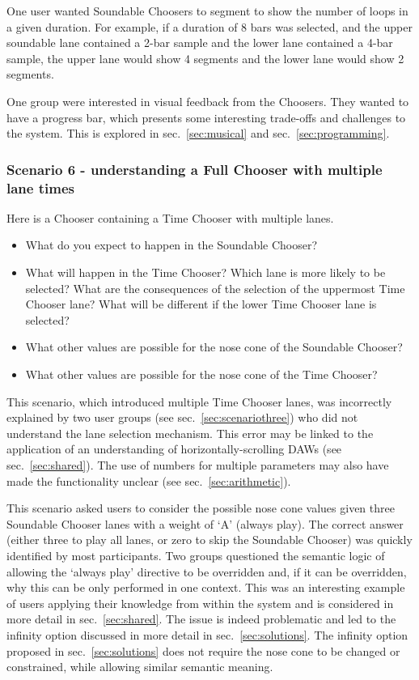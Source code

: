 \documentclass{ppig}
\begin{document}
One user wanted Soundable Choosers to segment to show the number of
loops in a given duration. For example, if a duration of 8 bars was
selected, and the upper soundable lane contained a 2-bar sample and the
lower lane contained a 4-bar sample, the upper lane would show 4
segments and the lower lane would show 2 segments.

One group were interested in visual feedback from the Choosers. They
wanted to have a progress bar, which presents some interesting
trade-offs and challenges to the system. This is explored in
sec.~\ref{sec:musical} and sec.~\ref{sec:programming}.

\hypertarget{sec:scenariosix}{%
\subsubsection{Scenario 6 - understanding a Full Chooser with multiple
lane times}\label{sec:scenariosix}}

Here is a Chooser containing a Time Chooser with multiple lanes.

\begin{itemize}
\item
  What do you expect to happen in the Soundable Chooser?
\item
  What will happen in the Time Chooser? Which lane is more likely to be
  selected? What are the consequences of the selection of the uppermost
  Time Chooser lane? What will be different if the lower Time Chooser
  lane is selected?
\item
  What other values are possible for the nose cone of the Soundable
  Chooser?
\item
  What other values are possible for the nose cone of the Time Chooser?
\end{itemize}

This scenario, which introduced multiple Time Chooser lanes, was
incorrectly explained by two user groups (see
sec.~\ref{sec:scenariothree}) who did not understand the lane selection
mechanism. This error may be linked to the application of an
understanding of horizontally-scrolling DAWs (see
sec.~\ref{sec:shared}). The use of numbers for multiple parameters may
also have made the functionality unclear (see
sec.~\ref{sec:arithmetic}).

This scenario asked users to consider the possible nose cone values
given three Soundable Chooser lanes with a weight of `A' (always play).
The correct answer (either three to play all lanes, or zero to skip the
Soundable Chooser) was quickly identified by most participants. Two
groups questioned the semantic logic of allowing the `always play'
directive to be overridden and, if it can be overridden, why this can be
only performed in one context. This was an interesting example of users
applying their knowledge from within the system and is considered in
more detail in sec.~\ref{sec:shared}. The issue is indeed problematic
and led to the infinity option discussed in more detail in
sec.~\ref{sec:solutions}. The infinity option proposed in
sec.~\ref{sec:solutions} does not require the nose cone to be changed or
constrained, while allowing similar semantic meaning.
\end{document}
